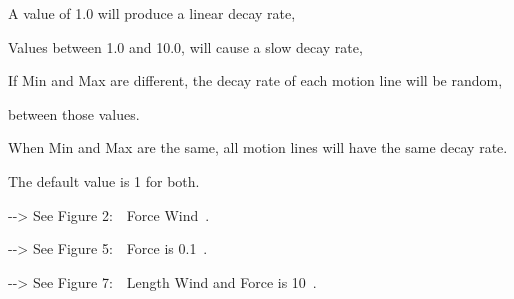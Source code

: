 \documentclass[a4paper,12pt]{article}
\begin{document}
A value of 1.0 will produce a linear decay rate,\par
Values between 1.0 and 10.0, will cause a slow decay rate,\par
If Min and Max are different, the decay rate of each motion line will be random,\par 
between those values.\par
When Min and Max are the same, all motion lines will have the same decay rate.\par
The default value is 1 for both.\par
-{-}> See \textquotedbl Figure 2:\ \ Force Wind\textquotedbl \ .\par
-{-}> See \textquotedbl Figure 5:\ \ Force is 0.1\textquotedbl \ .\par
-{-}> See \textquotedbl Figure 7:\ \ Length Wind and Force is 10\textquotedbl \ .\\
\newpage

\thispagestyle{empty}
\end{document}
